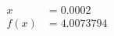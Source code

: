 \documentclass[preview]{standalone}
\begin{document}
\begin{align*}
x &= 0.0002\\f(x) &= 4.0073794
\end{align*}
\end{document}
